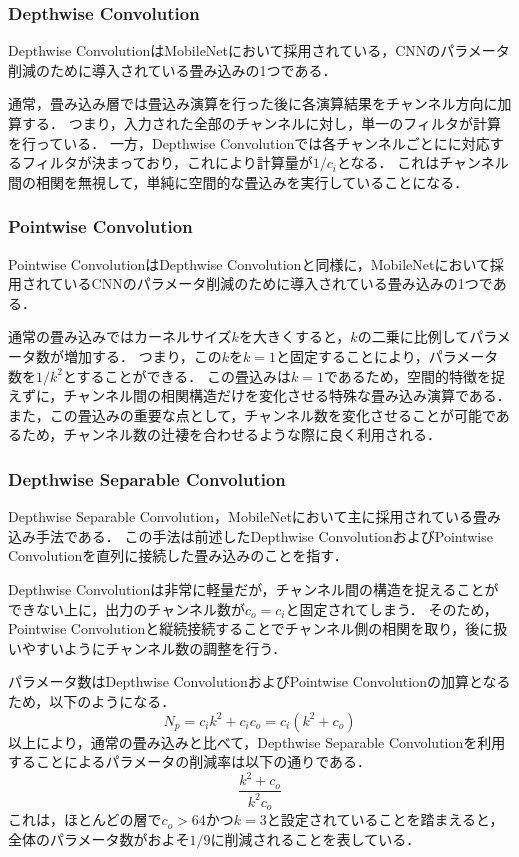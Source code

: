     \subsubsection{Depthwise Convolution}
    Depthwise ConvolutionはMobileNet\cite{howard2017mobilenets}において採用されている，CNNのパラメータ削減のために導入されている畳み込みの1つである．
    
    通常，畳み込み層では畳込み演算を行った後に各演算結果をチャンネル方向に加算する．
    つまり，入力された全部のチャンネルに対し，単一のフィルタが計算を行っている．
    一方，Depthwise Convolutionでは各チャンネルごとにに対応するフィルタが決まっており，これにより計算量が$1/c_i$となる．
    これはチャンネル間の相関を無視して，単純に空間的な畳込みを実行していることになる．
    
    \subsubsection{Pointwise Convolution}
    Pointwise ConvolutionはDepthwise Convolutionと同様に，MobileNet\cite{howard2017mobilenets}において採用されているCNNのパラメータ削減のために導入されている畳み込みの1つである．
    
    通常の畳み込みではカーネルサイズ$k$を大きくすると，$k$の二乗に比例してパラメータ数が増加する．
    つまり，この$k$を$k=1$と固定することにより，パラメータ数を$1/k^2$とすることができる．
    この畳込みは$k=1$であるため，空間的特徴を捉えずに，チャンネル間の相関構造だけを変化させる特殊な畳み込み演算である．
    また，この畳込みの重要な点として，チャンネル数を変化させることが可能であるため，チャンネル数の辻褄を合わせるような際に良く利用される．
    
    \subsubsection{Depthwise Separable Convolution}
    Depthwise Separable Convolution，MobileNet\cite{howard2017mobilenets}において主に採用されている畳み込み手法である．
    この手法は前述したDepthwise ConvolutionおよびPointwise Convolutionを直列に接続した畳み込みのことを指す．

    Depthwise Convolutionは非常に軽量だが，チャンネル間の構造を捉えることができない上に，出力のチャンネル数が$c_o=c_i$と固定されてしまう．
    そのため，Pointwise Convolutionと縦続接続することでチャンネル側の相関を取り，後に扱いやすいようにチャンネル数の調整を行う．

    パラメータ数はDepthwise ConvolutionおよびPointwise Convolutionの加算となるため，以下のようになる．
    \begin{equation}
        N_p = c_i k^2 + c_i c_o = c_i (k^2 + c_o)
    \end{equation}
    以上により，通常の畳み込みと比べて，Depthwise Separable Convolutionを利用することによるパラメータの削減率は以下の通りである．
    \begin{equation}
        \frac{k^2 + c_o}{k^2 c_o}
    \end{equation}
    これは，ほとんどの層で$c_o>64$かつ$k=3$と設定されていることを踏まえると，全体のパラメータ数がおよそ$1/9$に削減されることを表している．

